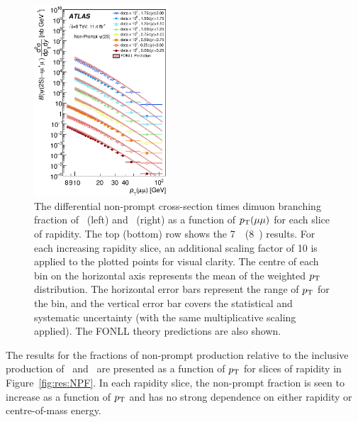 \begin{description}[style=unboxed,leftmargin=0cm]
\begin{figure} [!ht]
\begin{center}
    \includegraphics[width=0.44\textwidth]{figures/ct_8TeV_Psi2SNP_xSec.eps}\hfil
    \caption{The differential non-prompt cross-section times dimuon branching fraction of \jpsi\ (left) and \psiprime\ (right) as a function 
    of $\mbox{$p_{\text{T}}$}(\mu\mu)$ for each slice of rapidity. 
    The top (bottom) row shows the 7~\TeV\ (8~\TeV) results.
    For each increasing rapidity slice, an additional scaling factor of 10 is applied to the plotted points for visual clarity. The
      centre of each bin on the horizontal axis represents the mean of the weighted $\mbox{$p_{\text{T}}$}$ distribution. The
      horizontal error bars represent the range of $\mbox{$p_{\text{T}}$}$ for the bin, and the vertical error bar covers the statistical
      and systematic uncertainty (with the same multiplicative scaling applied).
      The FONLL theory predictions are also shown.}
    \label{fig:res:xSecNP}
  \end{center}
\end{figure} 


\item[Non-prompt production fractions] \hfill %

The results for the fractions of non-prompt production relative to the inclusive production of \jpsi\ and \psiprime\, are presented as a function of $\mbox{$p_{\text{T}}$}$ for slices of rapidity in Figure~\ref{fig:res:NPF}. 
In each rapidity slice, the non-prompt fraction is seen to increase as a function of $\mbox{$p_{\text{T}}$}$ and has no strong dependence on either rapidity or centre-of-mass energy.


\end{description}
